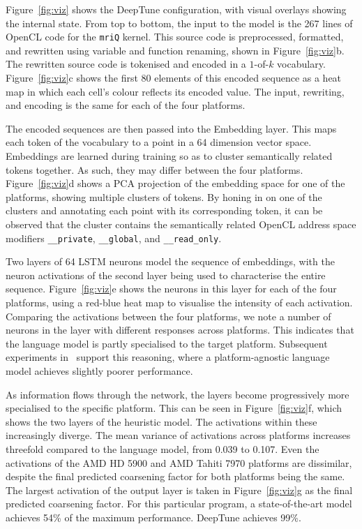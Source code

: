 Figure~\ref{fig:viz} shows the DeepTune configuration, with visual overlays showing the internal state. From top to bottom, the input to the model is the 267 lines of OpenCL code for the \texttt{mriQ} kernel. This source code is preprocessed, formatted, and rewritten using variable and function renaming, shown in Figure~\ref{fig:viz}b. The rewritten source code is tokenised and encoded in a $1$-of-$k$ vocabulary. Figure~\ref{fig:viz}c shows the first 80 elements of this encoded sequence as a heat map in which each cell's colour reflects its encoded value. The input, rewriting, and encoding is the same for each of the four platforms.



The encoded sequences are then passed into the Embedding layer. This maps each token of the vocabulary to a point in a 64 dimension vector space. Embeddings are learned during training so as to cluster semantically related tokens together. As such, they may differ between the four platforms. Figure~\ref{fig:viz}d shows a PCA projection of the embedding space for one of the platforms, showing multiple clusters of tokens. By honing in on one of the clusters and annotating each point with its corresponding token, it can be observed that the cluster contains the semantically related OpenCL address space modifiers \texttt{\_\_private}, \texttt{\_\_global}, and \texttt{\_\_read\_only}.

Two layers of 64 LSTM neurons model the sequence of embeddings, with the neuron activations of the second layer being used to characterise the entire sequence. Figure~\ref{fig:viz}e shows the neurons in this layer for each of the four platforms, using a red-blue heat map to visualise the intensity of each activation. Comparing the activations between the four platforms, we note a number of neurons in the layer with different responses across platforms. This indicates that the language model is partly specialised to the target platform. Subsequent experiments in~\cite{Ben-nun2018} support this reasoning, where a platform-agnostic language model achieves slightly poorer performance.

As information flows through the network, the layers become progressively more specialised to the specific platform. This can be seen in Figure~\ref{fig:viz}f, which shows the two layers of the heuristic model. The activations within these increasingly diverge. The mean variance of activations across platforms increases threefold compared to the language model, from 0.039 to 0.107. Even the activations of the AMD HD 5900 and AMD Tahiti 7970 platforms are dissimilar, despite the final predicted coarsening factor for both platforms being the same. The largest activation of the output layer is taken in Figure~\ref{fig:viz}g as the final predicted coarsening factor. For this particular program, a state-of-the-art model achieves 54\% of the maximum performance. DeepTune achieves 99\%.



